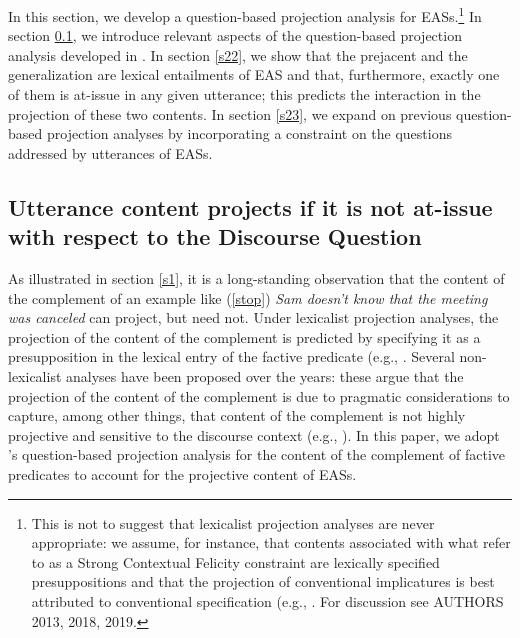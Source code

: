\documentclass[11pt,fleqn]{article}
\newcommand{\6}{\mbox{$[\hspace*{-.6mm}[$}}
\newcommand{\9}{\mbox{$]\hspace*{-.6mm}]$}}
\newcommand{\citepos}[1]{\citeauthor{#1}'s \citeyear{#1}}
\begin{document}
In this section, we develop a question-based projection analysis for EASs.\footnote{This is not to suggest that lexicalist projection analyses are never appropriate: we assume, for instance, that contents associated with what \citealt{brst-lang11} refer to as a Strong Contextual Felicity constraint are lexically specified presuppositions and that the projection of conventional implicatures is best attributed to conventional specification (e.g., \citealt{potts05,murray2014}. For discussion  see AUTHORS 2013, 2018, 2019.
} In section \ref{s21}, we introduce relevant aspects of the question-based projection analysis developed in \citealt{best-question}. In section \ref{s22}, we show that the prejacent and the generalization are lexical entailments of EAS and that, furthermore, exactly one of them is at-issue in any given utterance; this predicts the interaction in the projection of these two contents. In section \ref{s23}, we expand on previous question-based projection analyses by incorporating a constraint on the questions addressed by utterances of EASs.

\subsection{Utterance content projects if it is not at-issue with respect to the Discourse Question}\label{s21}

As illustrated in section \ref{s1}, it is a long-standing observation that the content of the complement of an example like (\ref{stop}) {\em Sam doesn't know that the meeting was canceled} can project, but need not. Under lexicalist projection analyses, the projection of the content of the complement is predicted by specifying it as a presupposition in the lexical entry of the factive predicate (e.g., \citealt{heim83,vds92,schlenker10}. Several non-lexicalist analyses have been proposed over the years: these argue that the projection of the content of the complement is due to pragmatic considerations to capture, among other things, that content of the complement is not highly projective and sensitive to the discourse context (e.g., \citealt{wilson75,simons01,abusch02,abusch10,abrusan2011,abrusan2016,romoli2015}). In this paper, we adopt \citepos{best-question} question-based projection analysis for the content of the complement of factive predicates to account for the projective content of EASs.
\end{document}
